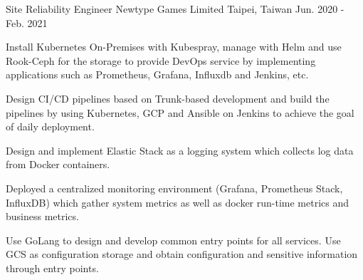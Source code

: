 

\begin{cventries}

\cventry
{Site Reliability Engineer} %
{Newtype Games Limited} %
{Taipei, Taiwan} %
{Jun. 2020 - Feb. 2021} %
{
  \begin{cvitems} %
    \item {Install Kubernetes On-Premises with Kubespray, manage with Helm and use Rook-Ceph for the storage to provide DevOps service by implementing applications such as Prometheus, Grafana, Influxdb and Jenkins, etc.}
    \item {Design CI/CD pipelines based on Trunk-based development and build the pipelines by using Kubernetes, GCP and Ansible on Jenkins to achieve the goal of daily deployment.}
    \item {Design and implement Elastic Stack as a logging system which collects log data from Docker containers.}
    \item {Deployed a centralized monitoring environment (Grafana, Prometheus Stack, InfluxDB) which gather system metrics as well as docker run-time metrics and business metrics.}
    \item {Use GoLang to design and develop common entry points for all services. Use GCS as configuration storage and obtain configuration and sensitive information through entry points.}
  \end{cvitems}
}


\end{cventries}

